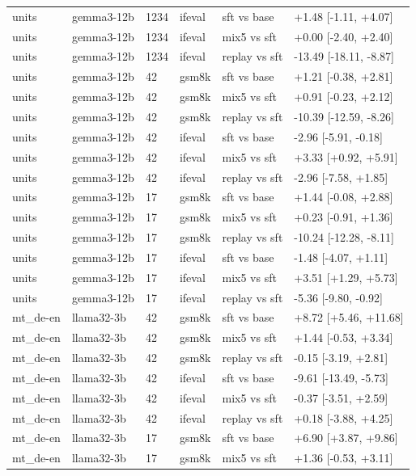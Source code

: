 \begin{table}[t]
\begin{tabular}{llllll}
units & gemma3-12b & 1234 & ifeval & sft vs base & +1.48 [-1.11, +4.07] \\
units & gemma3-12b & 1234 & ifeval & mix5 vs sft & +0.00 [-2.40, +2.40] \\
units & gemma3-12b & 1234 & ifeval & replay vs sft & -13.49 [-18.11, -8.87] \\
units & gemma3-12b & 42 & gsm8k & sft vs base & +1.21 [-0.38, +2.81] \\
units & gemma3-12b & 42 & gsm8k & mix5 vs sft & +0.91 [-0.23, +2.12] \\
units & gemma3-12b & 42 & gsm8k & replay vs sft & -10.39 [-12.59, -8.26] \\
units & gemma3-12b & 42 & ifeval & sft vs base & -2.96 [-5.91, -0.18] \\
units & gemma3-12b & 42 & ifeval & mix5 vs sft & +3.33 [+0.92, +5.91] \\
units & gemma3-12b & 42 & ifeval & replay vs sft & -2.96 [-7.58, +1.85] \\
units & gemma3-12b & 17 & gsm8k & sft vs base & +1.44 [-0.08, +2.88] \\
units & gemma3-12b & 17 & gsm8k & mix5 vs sft & +0.23 [-0.91, +1.36] \\
units & gemma3-12b & 17 & gsm8k & replay vs sft & -10.24 [-12.28, -8.11] \\
units & gemma3-12b & 17 & ifeval & sft vs base & -1.48 [-4.07, +1.11] \\
units & gemma3-12b & 17 & ifeval & mix5 vs sft & +3.51 [+1.29, +5.73] \\
units & gemma3-12b & 17 & ifeval & replay vs sft & -5.36 [-9.80, -0.92] \\
mt\_de-en & llama32-3b & 42 & gsm8k & sft vs base & +8.72 [+5.46, +11.68] \\
mt\_de-en & llama32-3b & 42 & gsm8k & mix5 vs sft & +1.44 [-0.53, +3.34] \\
mt\_de-en & llama32-3b & 42 & gsm8k & replay vs sft & -0.15 [-3.19, +2.81] \\
mt\_de-en & llama32-3b & 42 & ifeval & sft vs base & -9.61 [-13.49, -5.73] \\
mt\_de-en & llama32-3b & 42 & ifeval & mix5 vs sft & -0.37 [-3.51, +2.59] \\
mt\_de-en & llama32-3b & 42 & ifeval & replay vs sft & +0.18 [-3.88, +4.25] \\
mt\_de-en & llama32-3b & 17 & gsm8k & sft vs base & +6.90 [+3.87, +9.86] \\
mt\_de-en & llama32-3b & 17 & gsm8k & mix5 vs sft & +1.36 [-0.53, +3.11] \\

\end{tabular}
\end{table}
